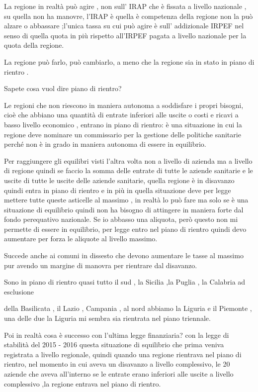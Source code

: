 La regione in realtà può agire , non sull' IRAP che è fissata a livello
nazionale , su quella non ha manovre, l'IRAP è quella è competenza della
regione non la può alzare o abbassare ;l'unica tassa su cui può agire è
sull' addizionale IRPEF nel senso di quella quota in più rispetto
all'IRPEF pagata a livello nazionale per la quota della regione.

La regione può farlo, può cambiarlo, a meno che la regione sia in stato
in piano di rientro .

Sapete cosa vuol dire piano di rientro?

Le regioni che non riescono in maniera autonoma a soddisfare i propri
bisogni, cioè che abbiano una quantità di entrate inferiori alle uscite
o costi e ricavi a basso livello economico , entrano in piano di
rientro: è una situazione in cui la regione deve nominare un commissario
per la gestione delle politiche sanitarie perché non è in grado in
maniera autonoma di essere in equilibrio.

Per raggiungere gli equilibri visti l'altra volta non a livello di
azienda ma a livello di regione quindi se faccio la somma delle entrate
di tutte le aziende sanitarie e le uscite di tutte le uscite delle
aziende sanitarie, quella regione è in disavanzo quindi entra in piano
di rientro e in più in quella situazione deve per legge mettere tutte
queste asticelle al massimo , in realtà lo può fare ma solo se è una
situazione di equilibrio quindi non ha bisogno di attingere in maniera
forte dal fondo perequativo nazionale. Se io abbasso una aliquota, però
questo non mi permette di essere in equilibrio, per legge entro nel
piano di rientro quindi devo aumentare per forza le aliquote al livello
massimo.

Succede anche ai comuni in dissesto che devono aumentare le tasse al
massimo pur avendo un margine di manovra per rientrare dal disavanzo.

Sono in piano di rientro quasi tutto il sud , la Sicilia ,la Puglia , la
Calabria ad esclusione

della Basilicata , il Lazio , Campania , al nord abbiamo la Liguria e il
Piemonte , una delle due la Liguria mi sembra sia rientrata nel piano
triennale.

Poi in realtà cosa è successo con l'ultima legge finanziaria? con la
legge di stabilità del 2015 - 2016 questa situazione di squilibrio che
prima veniva registrata a livello regionale, quindi quando una regione
rientrava nel piano di rientro, nel momento in cui aveva un disavanzo a
livello complessivo, le 20 aziende che aveva all'interno se le entrate
erano inferiori alle uscite a livello complessivo ,la regione entrava
nel piano di rientro.

